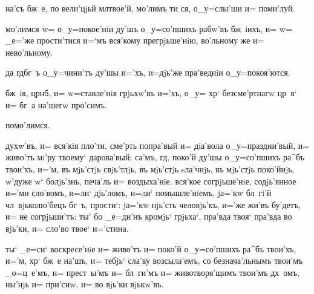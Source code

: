 
 на'съ бж~е, по вели'цjьй мл твое'й, 
мо'лимъ ти ся, о_у=слы'ши и= поми'луй.


 мо'лимся w= о_у=покое'нiи ду'шъ о_у=со'пшихъ 
рабw'въ бж~iихъ,  и= w= _е='же прости'тися и=`мъ 
вся'кому прегрjьше'нiю, во'льному же и= нево'льному.


 да гд бг~ъ о_у=чини'тъ ду'шы и='хъ, и=дjь'же 
пра'веднiи о_у=покоя'ются.


 бж~iя, цр нб, и= w=ставле'нiя 
грjьхw'въ и='хъ, о_у= хр` безсме'ртнагw цр~я` и= бг~а 
на'шегw про'симъ.


  помо'лимся.



 духw'въ, и= вся'кiя пло'ти, сме'рть попра'вый и= 
дiа'вола о_у=праздни'вый, и= живо'тъ мi'ру твоему` 
дарова'вый: са'мъ, гд, поко'й ду'шы о_у=со'пшихъ ра^бъ 
твои'хъ, и='м, въ мjь'стjь свjь'тлjь, въ мjь'стjь 
sла'чнjь, въ мjь'стjь поко'йнjь, w'дуже w` 
болjь'знь, печа'ль и= воздыха'нiе. вся'кое согрjьше'нiе, 
содjь'янное и='ми сло'вомъ, и=ли` дjь'ломъ, и=ли` 
помышле'нiемъ, jа='кw бл~гi'й чл~вjьколю'бецъ бг~ъ, 
прости`: jа='кw нjь'сть человjь'къ, и='же жи'въ бу'детъ, 
и= не согрjьши'тъ: ты' бо _е=ди'нъ кромjь` грjьха`, 
пра'вда твоя` пра'вда во вjь'ки, и= сло'во твое` 
и='стина.


 ты` _е=си` воскресе'нiе и= живо'тъ и= поко'й 
о_у=со'пшихъ ра^бъ твои'хъ, и='м, хр` бж~е на'шъ, 
и= тебjь` сла'ву возсыла'емъ, со безнача'льнымъ твои'мъ 
_о=ц~е'мъ, и= прест~ы'мъ и= бл~ги'мъ и= животворя'щимъ 
твои'мъ дх~омъ, ны'нjь и= при'снw, и= во вjь'ки вjькw'въ.


